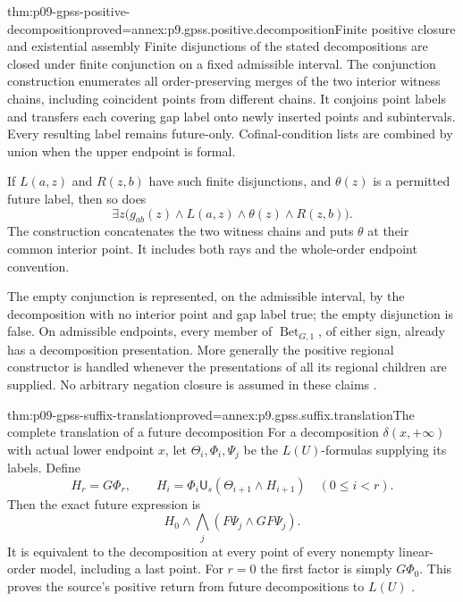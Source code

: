 \begin{hbtheorem}{thm:p09-gpss-positive-decomposition}{proved=annex:p9.gpss.positive.decomposition}{Finite positive closure and existential assembly}
Finite disjunctions of the stated decompositions are closed under
finite conjunction on a fixed admissible interval. The conjunction
construction enumerates all order-preserving merges of the two
interior witness chains, including coincident points from different
chains. It conjoins point labels and transfers each covering
gap label onto newly inserted points and subintervals. Every resulting
label remains future-only. Cofinal-condition lists are combined by
union when the upper endpoint is formal.

If \(L(a,z)\) and \(R(z,b)\) have such finite disjunctions,
and \(\theta(z)\) is a permitted future label, then so does
\[
 \exists z\bigl(g_{ab}(z)\land L(a,z)\land\theta(z)\land R(z,b)\bigr).
\]
The construction concatenates the two witness chains and puts
\(\theta\) at their common interior point. It includes both rays
and the whole-order endpoint convention.

The empty conjunction is represented, on the admissible interval,
by the decomposition with no interior point and gap label true;
the empty disjunction is false. On admissible endpoints, every member of
\(\operatorname{Bet}_{G,1}\), of either sign, already has a
decomposition presentation. More generally the positive regional
constructor is handled whenever the presentations of all its
regional children are supplied. No arbitrary negation closure is
assumed in these claims
\cite[pp.~170--171]{GabbayPnueliShelahStavi1980}.
\end{hbtheorem}

\begin{hblemma}{thm:p09-gpss-suffix-translation}{proved=annex:p9.gpss.suffix.translation}{The complete translation of a future decomposition}
For a decomposition \(\delta(x,+\infty)\) with actual lower
endpoint \(x\), let \(\Theta_i,\Phi_i,\Psi_j\) be
the \(L(U)\)-formulas supplying its labels. Define
\[
 H_r=G\Phi_r,\qquad
 H_i=\Phi_i\mathbin{\mathsf U_s}(\Theta_{i+1}\land H_{i+1})
                    \quad(0\leq i<r).
\]
Then the exact future expression is
\[
                 H_0\land\bigwedge_j(F\Psi_j\land GF\Psi_j).
\]
It is equivalent to the decomposition at every point of every
nonempty linear-order model, including a last point. For \(r=0\)
the first factor is simply \(G\Phi_0\). This proves the
source's positive return from future decompositions to \(L(U)\)
\cite[p.~171]{GabbayPnueliShelahStavi1980}.
\end{hblemma}

